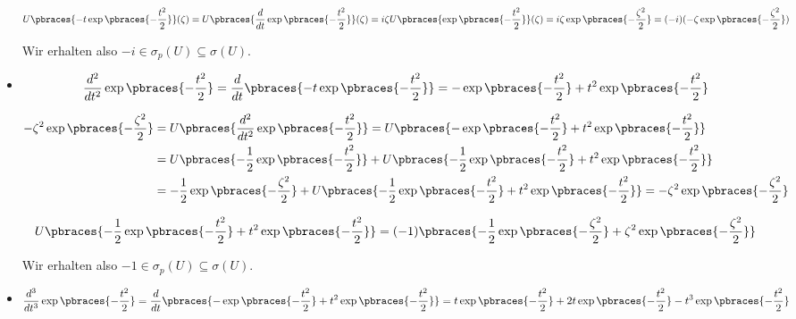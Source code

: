\begin{solution}
\begin{itemize}
  \begin{align*}
    U \pbraces{-t \exp \pbraces{-\frac{t^2}{2}}}(\zeta)
    =
    U \pbraces{\frac{d}{dt} \exp \pbraces{-\frac{t^2}{2}}}(\zeta)
    =
    i \zeta U \pbraces{\exp \pbraces{-\frac{t^2}{2}}}(\zeta)
    =
    i \zeta \exp \pbraces{-\frac{\zeta^2}{2}}
    =
    (-i) (-\zeta \exp \pbraces{-\frac{\zeta^2}{2}})
  \end{align*}

  Wir erhalten also $-i \in \sigma_p(U) \subseteq \sigma(U)$.
  \item
  \begin{align*}
    \frac{d^2}{dt^2}
    \exp \pbraces{-\frac{t^2}{2}}
    =
    \frac{d}{dt}
    \pbraces{-t \exp \pbraces{-\frac{t^2}{2}}}
    =
    -\exp \pbraces{-\frac{t^2}{2}} +
    t^2 \exp \pbraces{-\frac{t^2}{2}}
  \end{align*}

  \begin{align*}
    -\zeta^2 \exp \pbraces{-\frac{\zeta^2}{2}}
    & =
    U \pbraces
    {
      \frac{d^2}{dt^2}
      \exp \pbraces{-\frac{t^2}{2}}
    }
    =
    U \pbraces
    {
      -\exp \pbraces{-\frac{t^2}{2}} +
      t^2 \exp \pbraces{-\frac{t^2}{2}}
    } \\
    & =
    U \pbraces
    {
      -\frac{1}{2}
      \exp \pbraces{-\frac{t^2}{2}}
    } +
    U \pbraces
    {
      -\frac{1}{2}
      \exp \pbraces{-\frac{t^2}{2}} +
      t^2 \exp \pbraces{-\frac{t^2}{2}}
    } \\
    & =
    -\frac{1}{2} \exp \pbraces{-\frac{\zeta^2}{2}} +
    U \pbraces
    {
      -\frac{1}{2}
      \exp \pbraces{-\frac{t^2}{2}} +
      t^2 \exp \pbraces{-\frac{t^2}{2}}
    }
    =
    -\zeta^2 \exp \pbraces{-\frac{\zeta^2}{2}}
  \end{align*}

  \begin{align*}
    U \pbraces
    {
      -\frac{1}{2}
      \exp \pbraces{-\frac{t^2}{2}} +
      t^2 \exp \pbraces{-\frac{t^2}{2}}
    }
    =
    (-1) \pbraces
    {
      -\frac{1}{2}
      \exp \pbraces{-\frac{\zeta^2}{2}} +
      \zeta^2
      \exp \pbraces{-\frac{\zeta^2}{2}}
    }
  \end{align*}

  Wir erhalten also $-1 \in \sigma_p(U) \subseteq \sigma(U)$.
  \item
  \begin{align*}
    \frac{d^3}{dt^3}
    \exp \pbraces{-\frac{t^2}{2}}
    =
    \frac{d}{dt}
    \pbraces
    {
      -\exp \pbraces{-\frac{t^2}{2}} +
      t^2 \exp \pbraces{-\frac{t^2}{2}}
    }
    =
    t \exp \pbraces{-\frac{t^2}{2}} +
    2 t \exp \pbraces{-\frac{t^2}{2}} -
    t^3 \exp \pbraces{-\frac{t^2}{2}}
  \end{align*}


\end{itemize}
\end{solution}
